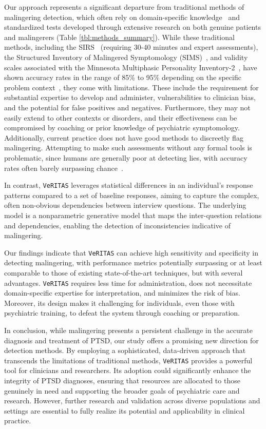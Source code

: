 \documentclass[onecolumn,10pt]{IEEEtran}
\def\vrts{\texttt{VeRITAS}\xspace}
\begin{document}
Our approach represents a significant departure from traditional methods of malingering detection, which often rely on domain-specific knowledge~\cite{walczyk2018review} and standardized tests developed through extensive research on both genuine patients and malingerers (Table \ref{tbl:methods_summary}). While these traditional methods, including the SIRS~\cite{Wong2005} (requiring 30-40 minutes and expert assessments), the Structured Inventory of Malingered Symptomology (SIMS)~\cite{smith1997detection}, and validity scales associated with the Minnesota Multiphasic Personality Inventory-2~\cite{ben2012interpreting}, have shown accuracy rates in the range of 85\% to 95\% depending on the specific problem context~\cite{rogers2008determinations,sartori2008accurately,gregg2007vying,monaro2017detection}, they come with limitations. These include the requirement for substantial expertise to develop and administer, vulnerabilities to clinician bias, and the potential for false positives and negatives. Furthermore, they may not easily extend to other contexts or disorders, and their effectiveness can be compromised by coaching or prior knowledge of psychiatric symptomology.
Additionally, current practice does not have good methods to discreetly flag malingering. Attempting to make such assessments without any formal tools is problematic, since humans are 
generally poor at detecting lies, with accuracy rates often barely surpassing chance~\cite{ekman1991who}.


In contrast, \vrts leverages statistical  differences in an individual's response patterns compared to a set of baseline responses, aiming to capture the complex, often non-obvious dependencies between interview questions. The underlying model is a  nonparametric generative model that maps the inter-question relations and dependencies, enabling the detection of inconsistencies indicative of malingering. 

Our findings indicate that \vrts can achieve high sensitivity and specificity in detecting malingering, with performance metrics potentially surpassing or at least comparable to those of existing state-of-the-art techniques, but with several advantages. \vrts requires less time for administration, does not necessitate domain-specific expertise for interpretation, and minimizes the risk of bias. Moreover, its design makes it challenging for individuals, even those with psychiatric training, to defeat the system through coaching or preparation.

In conclusion, while malingering presents a persistent challenge in the accurate diagnosis and treatment of PTSD, our study offers a promising new direction for detection methods. By employing a sophisticated, data-driven approach that transcends the limitations of traditional methods, \vrts provides a powerful tool for clinicians and researchers. Its adoption could significantly enhance the integrity of PTSD diagnoses, ensuring that resources are allocated to those genuinely in need and supporting the broader goals of psychiatric care and research. However, further research and validation across diverse populations and settings are essential to fully realize its potential and applicability in clinical practice.
\end{document}
